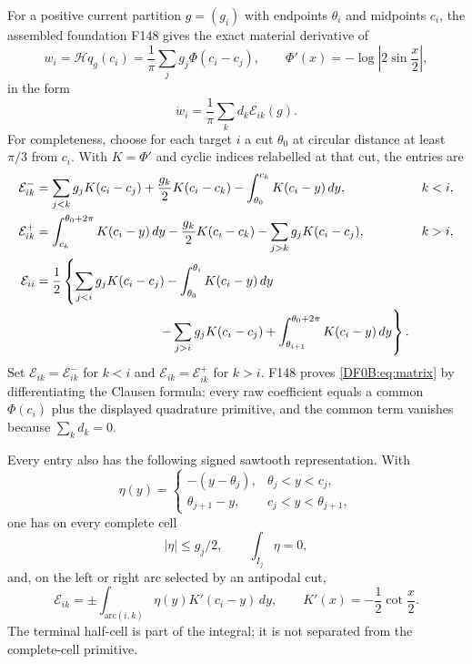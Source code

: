 \documentclass[11pt]{amsart}
\numberwithin{equation}{section}
\theoremstyle{definition}
\theoremstyle{remark}
\newcommand{\Hil}{\mathcal H}
\begin{document}
For a positive current partition $g=(g_i)$ with endpoints $\theta_i$ and
midpoints $c_i$, the assembled foundation F148 gives the exact material
derivative of
\begin{equation}\label{DF0B:eq:w}
 w_i=\Hil q_g(c_i)=\frac1\pi\sum_jg_j\Phi(c_i-c_j),
 \qquad \Phi'(x)=-\log\left|2\sin\frac x2\right|,
\end{equation}
in the form
\begin{equation}\label{DF0B:eq:matrix}
 \dot w_i=\frac1\pi\sum_kd_k\mathcal E_{ik}(g).
\end{equation}
For completeness, choose for each target $i$ a cut $\theta_0$ at circular
distance at least $\pi/3$ from $c_i$.  With
$K=\Phi'$ and cyclic indices relabelled at that cut, the entries are
\begin{align}
 \mathcal E_{ik}^-&=
 \sum_{j<k}g_jK(c_i-c_j)+\frac{g_k}{2}K(c_i-c_k)
 -\int_{\theta_0}^{c_k}K(c_i-y)\,dy, &&k<i,\notag\\
 \mathcal E_{ik}^+&=
 \int_{c_k}^{\theta_0+2\pi}K(c_i-y)\,dy
 -\frac{g_k}{2}K(c_i-c_k)-\sum_{j>k}g_jK(c_i-c_j), &&k>i,
 \label{DF0B:eq:E-explicit}\\
 \mathcal E_{ii}&=\frac12\left\{
 \sum_{j<i}g_jK(c_i-c_j)-\int_{\theta_0}^{\theta_i}K(c_i-y)\,dy
 \right.\notag\\
 &\hspace{34mm}\left.
 -\sum_{j>i}g_jK(c_i-c_j)
 +\int_{\theta_{i+1}}^{\theta_0+2\pi}K(c_i-y)\,dy
 \right\}.\notag
\end{align}
Set $\mathcal E_{ik}=\mathcal E_{ik}^-$ for $k<i$ and
$\mathcal E_{ik}=\mathcal E_{ik}^+$ for $k>i$.  F148 proves
\eqref{DF0B:eq:matrix} by differentiating the Clausen formula: every raw
coefficient equals a common $\Phi(c_i)$ plus the displayed quadrature
primitive, and the common term vanishes because $\sum_kd_k=0$.

Every entry also has the following signed sawtooth representation.  With
\begin{equation}\label{DF0B:eq:eta}
 \eta(y)=\begin{cases}
 -(y-\theta_j),&\theta_j<y<c_j,\\
 \theta_{j+1}-y,&c_j<y<\theta_{j+1},
 \end{cases}
\end{equation}
one has on every complete cell
\begin{equation}\label{DF0B:eq:eta-properties}
 |\eta|\le g_j/2,\qquad \int_{I_j}\eta=0,
\end{equation}
and, on the left or right arc selected by an antipodal cut,
\begin{equation}\label{DF0B:eq:saw}
 \mathcal E_{ik}=\pm\int_{\mathrm{arc}(i,k)}
 \eta(y)K'(c_i-y)\,dy,
 \qquad K'(x)=-\frac12\cot\frac x2.
\end{equation}
The terminal half-cell is part of the integral; it is not separated from
the complete-cell primitive.
\end{document}
